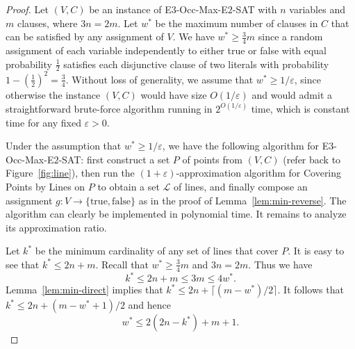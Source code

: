 \documentclass[letterpaper,11pt]{article}
\def\L{{\mathcal L}}
\newcommand{\eps}{\varepsilon}
\begin{document}
\begin{proof}
Let $(V,C)$ be an instance of {\sc E$3$-Occ-Max-E$2$-SAT} with $n$ variables
and $m$ clauses, where $3n = 2m$.
Let $w^*$ be the maximum number of clauses in $C$ that can be satisfied by
any assignment of $V$.
We have $w^* \ge \frac34 m$
since a random assignment of each variable independently to either true
or false with equal probability $\frac12$ satisfies each disjunctive clause
of two literals with probability $1 - (\frac12)^2 = \frac34$.
Without loss of generality, we assume that $w^* \ge 1/\eps$,
since otherwise the instance $(V,C)$ would have size $O(1/\eps)$
and would admit a straightforward brute-force algorithm
running in $2^{O(1/\eps)}$ time,
which is constant time for any fixed $\eps > 0$.

Under the assumption that $w^* \ge 1/\eps$,
we have the following algorithm for {\sc E$3$-Occ-Max-E$2$-SAT}:
first construct a set $P$ of points from $(V,C)$
(refer back to Figure~\ref{fig:line}),
then run the $(1+\eps)$-approximation algorithm for {\sc Covering Points by Lines} on $P$
to obtain a set $\L$ of lines,
and finally compose an assignment
$g:V \to \{\textrm{true}, \textrm{false}\}$
as in the proof of Lemma~\ref{lem:min-reverse}.
The algorithm can clearly be implemented in polynomial time.
It remains to analyze its approximation ratio.

Let $k^*$ be the minimum cardinality of any set of lines that cover $P$.
It is easy to see that $k^* \le 2n + m$.
Recall that $w^* \ge \frac34m$ and $3n = 2m$.
Thus we have
\begin{equation}\label{eq:k*w*}
k^* \le 2n + m \le 3m \le 4 w^*.
\end{equation}
Lemma~\ref{lem:min-direct} implies that
$k^* \le 2n + \lceil (m-w^*)/2 \rceil$.
It follows that
$k^* \le 2n + (m-w^*+1)/2$
and hence
\begin{equation}\label{eq:w*k*}
w^* \le 2(2n - k^*) + m + 1.
\end{equation}


\end{proof}
\end{document}
